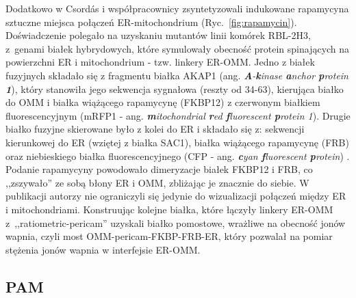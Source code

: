 Dodatkowo w \cite{Csordas2010} Csord\'{a}s i współpracownicy zsyntetyzowali indukowane rapamycyna sztuczne miejsca połączeń ER-mitochondrium (Ryc.~\ref{fig:rapamycin}). Doświadczenie polegało na uzyskaniu mutantów linii komórek RBL-2H3, z~genami białek hybrydowych, które symulowały obecność protein spinających na powierzchni ER i mitochondrium - tzw. linkery ER-OMM. Jedno z białek fuzyjnych składało się z fragmentu białka AKAP1 (ang. \textit{\textbf{A}-\textbf{k}inase \textbf{a}nchor \textbf{p}rotein \textbf{1}}), który stanowiła jego sekwencja sygnałowa (reszty od 34-63), kierująca białko do OMM i białka wiążącego rapamycynę (FKBP12) z czerwonym białkiem fluorescencyjnym (mRFP1 - ang. \textit{\textbf{m}itochondrial \textbf{r}ed \textbf{f}luorescent \textbf{p}rotein 1}). Drugie białko fuzyjne skierowane było z kolei do ER i składało się z: sekwencji kierunkowej do ER (wziętej z białka SAC1), białka wiążącego rapamycynę (FRB) oraz niebieskiego białka fluorescencyjnego (CFP - ang. \textit{\textbf{c}yan \textbf{f}luorescent \textbf{p}rotein}) \cite{Csordas2010}. Podanie rapamycyny powodowało dimeryzacje białek FKBP12 i FRB, co ,,zszywało'' ze sobą błony ER i OMM, zbliżając je znacznie do siebie. W publikacji autorzy nie ograniczyli się jedynie do wizualizacji połączeń między ER i mitochondriami. Konstruując kolejne białka, które łączyły linkery ER-OMM z~,,ratiometric-pericam'' uzyskali białko pomostowe, wrażliwe na obecność jonów wapnia, czyli most OMM-pericam-FKBP-FRB-ER, który pozwalał na pomiar stężenia jonów wapnia w interfejsie ER-OMM.


\FloatBarrier
\subsection{PAM}


